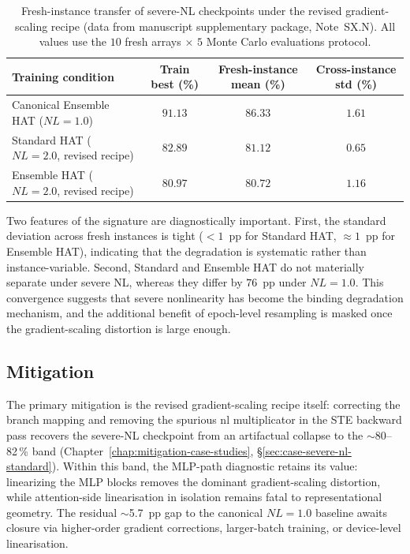 \begin{table}[ht]
    \centering
    \caption{Fresh-instance transfer of severe-NL checkpoints under the revised gradient-scaling recipe (data from manuscript supplementary package, Note~SX.N).  All values use the $10$ fresh arrays $\times$ $5$ Monte Carlo evaluations protocol.}
    \label{tab:fresh-instance-nl}
    \small
    \setlength{\tabcolsep}{5pt}
    \begin{tabular}{@{}lccc@{}}
        \toprule
        Training condition & Train best (\%) & Fresh-instance mean (\%) & Cross-instance std (\%) \\
        \midrule
        Canonical Ensemble HAT ($NL=1.0$) & $91.13$ & $86.33$ & $1.61$ \\
        Standard HAT ($NL=2.0$, revised recipe) & $82.89$ & $81.12$ & $0.65$ \\
        Ensemble HAT ($NL=2.0$, revised recipe) & $80.97$ & $80.72$ & $1.16$ \\
        \bottomrule
    \end{tabular}
\end{table}

Two features of the signature are diagnostically important.  First, the standard deviation across fresh instances is tight ($<1$~pp for Standard HAT, $\approx 1$~pp for Ensemble HAT), indicating that the degradation is systematic rather than instance-variable.  Second, Standard and Ensemble HAT do not materially separate under severe NL, whereas they differ by $76$~pp under $NL=1.0$.  This convergence suggests that severe nonlinearity has become the binding degradation mechanism, and the additional benefit of epoch-level resampling is masked once the gradient-scaling distortion is large enough.

\subsection{Mitigation}

The primary mitigation is the revised gradient-scaling recipe itself: correcting the branch mapping and removing the spurious nl multiplicator in the STE backward pass recovers the severe-NL checkpoint from an artifactual collapse to the $\sim$80--82\,\% band (Chapter~\ref{chap:mitigation-case-studies}, \S\ref{sec:case-severe-nl-standard}).  Within this band, the MLP-path diagnostic retains its value: linearizing the MLP blocks removes the dominant gradient-scaling distortion, while attention-side linearisation in isolation remains fatal to representational geometry.  The residual $\sim$5.7~pp gap to the canonical $NL=1.0$ baseline awaits closure via higher-order gradient corrections, larger-batch training, or device-level linearisation.

